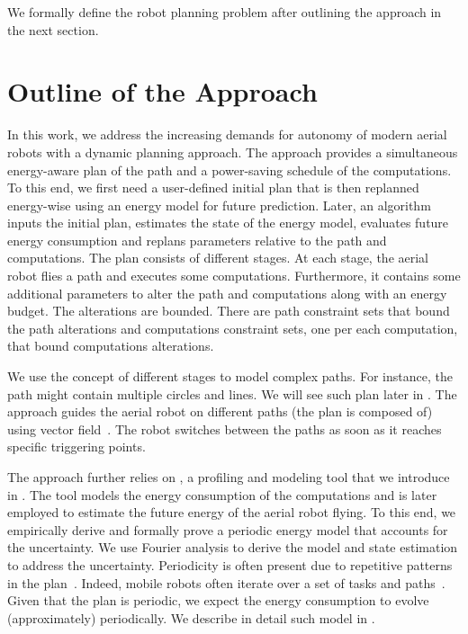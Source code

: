 We formally define the robot planning problem after outlining the approach in the next section.


\section{Outline of the Approach}
\label{sec:outline}

In this work, we address the increasing demands for autonomy of modern aerial robots with a dynamic planning approach. The approach provides a simultaneous energy-aware plan of the path and a power-saving schedule of the computations. To this end, we first need a user-defined initial plan that is then replanned energy-wise using an energy model for future prediction. Later, an algorithm inputs the initial plan, estimates the state of the energy model, evaluates future energy consumption and replans parameters relative to the path and computations. The plan consists of different stages. At each stage, the aerial robot flies a path and executes some computations. Furthermore, it contains some additional parameters to alter the path and computations along with an energy budget. The alterations are bounded. There are path constraint sets that bound the path alterations and computations constraint sets, one per each computation, that bound computations alterations.

We use the concept of different stages to model complex paths. For instance, the path might contain multiple circles and lines. We will see such plan later in . The approach guides the aerial robot on different paths (the plan is composed of) using vector field~\citep{de2017guidance}. The robot switches between the paths as soon as it reaches specific triggering points. 

The approach further relies on \powprof{}, a profiling and modeling tool that we introduce in . The tool models the energy consumption of the computations and is later employed to estimate the future energy of the aerial robot flying. To this end, we empirically derive and formally prove a periodic energy model that accounts for the uncertainty. We use Fourier analysis to derive the model and state estimation to address the uncertainty. Periodicity is often present due to repetitive patterns in the plan~\citep{seewald2020mechanical}. Indeed, mobile robots often iterate over a set of tasks and paths~\citep{seewald2021energy}. Given that the plan is periodic, we expect the energy consumption to evolve (approximately) periodically. We describe in detail such model in . 

